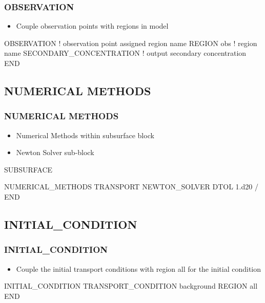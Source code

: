\documentclass{beamer}
\newcommand\bluecomment[1]{{{\color{blue} #1}}}
\newcommand\greencomment[1]{{{\color{green} #1}}}
\newcommand\magentacomment[1]{{{\color{magenta} #1}}}
\begin{document}
\begin{frame}[fragile]\frametitle{OBSERVATION}

\begin{itemize}
\item Couple observation points with regions in model
\end{itemize}

\begin{semiverbatim}
OBSERVATION  \bluecomment{! observation point assigned region name}
  REGION obs  \bluecomment{! region name}
  \magentacomment{SECONDARY_CONCENTRATION}\bluecomment{! output secondary concentration}
END

\end{semiverbatim}

\end{frame}

\subsection{NUMERICAL METHODS}

\begin{frame}[fragile]\frametitle{NUMERICAL METHODS}

\begin{itemize}
  \item Numerical Methods within subsurface block
  \item Newton Solver sub-block
\end{itemize}

\begin{semiverbatim}
SUBSURFACE

NUMERICAL_METHODS TRANSPORT
  NEWTON_SOLVER
    DTOL 1.d20
  /
END
\end{semiverbatim}

\end{frame}

\subsection{INITIAL\_CONDITION}

\begin{frame}[fragile]\frametitle{INITIAL\_CONDITION}

\begin{itemize}
\item Couple the \greencomment{initial} transport conditions with region \greencomment{all} for the initial condition
\end{itemize}

\begin{semiverbatim}

INITIAL_CONDITION
  TRANSPORT_CONDITION background
  REGION all
END

\end{semiverbatim}

\end{frame}
\end{document}
